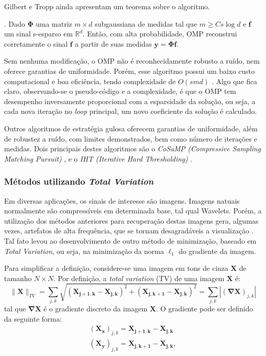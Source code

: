 \documentclass[cic,tc]{iiufrgs}
\renewcommand{\vec}[1]{\bm{#1}}
\newcommand{\mat}[1]{\bm{#1}}
\begin{document}
Gilbert e Tropp ainda apresentam um teorema sobre o algoritmo.
\begin{teorema}
    \cite{GilbertOMP}.
    Dado $\mathbf{\Phi}$ uma matriz $m \times d$ subgaussiana de medidas tal que $m \ge C s \log{d}$ e
    $\vec{f}$ um sinal s-esparso em $\mathbb{R}^d$.
    Então, com alta probabilidade, OMP reconstrui corretamente o sinal $\vec{f}$ a partir de suas
    medidas $\vec{y} = \mathbf{\Phi}\vec{f}$.
\end{teorema}
Sem nenhuma modificação, o OMP não é reconhecidamente robusto a ruído, nem oferece garantias de uniformidade.
Porém, esse algoritmo possui um baixo custo computacional e boa eficiência, tendo complexidade de
$O(s m d)$ \cite{chen2015compressed}. 
Algo que fica claro, observando-se o pseudo-código e a complexidade, é que o OMP tem desempenho inversamente
proporcional com a esparsidade da solução, ou seja, a cada nova iteração no \textit{loop} principal, um 
novo coeficiente da solução é calculado.

Outros algoritmos de estratégia gulosa oferecem garantias de uniformidade, além de robustez a ruído, com 
limites demonstrados, bem como número de iterações e medidas. Dois principais destes algoritmos são o 
\textit{CoSaMP (Compressive Sampling Matching Pursuit)} \cite{NeedellCoSaMP}, e o 
\textit{IHT (Iterative Hard Thresholding)} \cite{BLUMENSATHIHT}.

\subsubsection{Métodos utilizando \textit{Total Variation}}
Em diversas aplicações, os sinais de interesse são imagens. Imagens natuais normalmente são compressíveis
em determinada base, tal qual Wavelets. Porém, a utilização dos métodos anteriores para recuperação 
destas imagens gera, algumas vezes, artefatos de alta frequência, que se tornam desagradáveis a
visualização \cite{chen2015compressed}.
Tal fato levou ao desenvolvimento de outro método de minimização, baseado em \textit{Total Variation},
ou seja, na minimização da norma $\ell_1$ do gradiente da imagem.

Para simplificar a definição, considere-se uma imagem em tons de cinza $\mat{X}$ de tamanho $N\times N$.
Por definição, a \textit{total variation} (TV) de uma imagem $\mat{X}$ é:
\begin{equation}
    \lVert \mat{X} \rVert_{TV} = \sum_{j,k}
    \sqrt{\left( \mat{X_{j+1,k}} - \mat{X_{j,k}} \right)^2 + \left( \mat{X_{j,k+1}} - \mat{X_{j,k}} \right)^2} = 
    \sum_{j,k} |\mat{(\nabla X)}_{j,k} |
\end{equation}
tal que $\mat{\nabla X}$ é o gradiente discreto da imagem $\mat{X}$. O gradiente pode ser definido da 
seguinte forma:
\begin{align*}
    \mat{(X_x)}_{j,k} = \mat{X_{j+1,k}} - \mat{X_{j,k}} \\
    \mat{(X_y)}_{j,k} = \mat{X_{j,k+1}} - \mat{X_{j,k}},
\end{align*}
\end{document}
